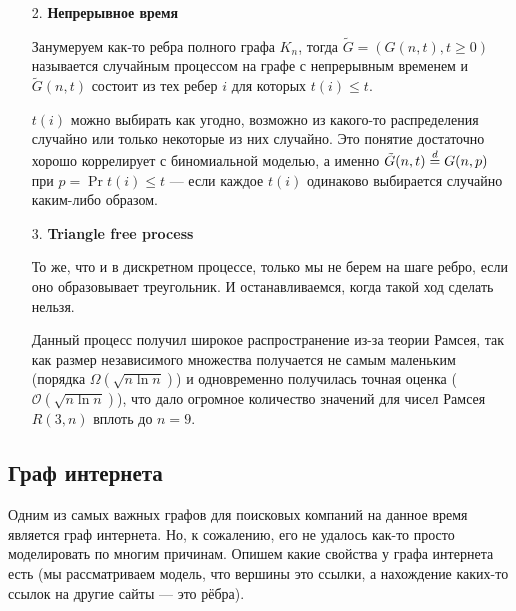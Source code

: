 \begin{itemize}
  \item[2.] \textbf{Непрерывное время}

  \begin{definition}
    Занумеруем как-то ребра полного графа $K_n$, тогда \newline $\tilde{G} = (G(n, t), t \geq 0)$
    называется случайным процессом на графе с непрерывным временем и $\tilde{G}(n, t)$
    состоит из тех ребер $i$ для которых $t(i) \leq t$.
  \end{definition}

  $t(i)$ можно выбирать как угодно, возможно из какого-то распределения случайно
  или только некоторые из них случайно. Это понятие достаточно хорошо коррелирует
  с биномиальной моделью, а именно $\tilde{G}(n, t) \overset{d}{=} G(n, p)$ при $p = 
  \Pr{t(i) \leq t}$ --- если каждое $t(i)$ одинаково выбирается случайно каким-либо
  образом.

  \item[3.] \textbf{Triangle free process}

  То же, что и в дискретном процессе, только мы не берем на шаге ребро, если
  оно образовывает треугольник. И останавливаемся, когда такой ход сделать нельзя.

  Данный процесс получил широкое распространение из-за теории Рамсея, так как
  размер независимого множества получается не самым маленьким (порядка $\Omega(\sqrt{n \ln n})$) и
  одновременно получилась точная оценка ($\mathcal{O}(\sqrt{n \ln n})$), что дало огромное
  количество значений для чисел Рамсея $R(3, n)$ вплоть до $n = 9$.
\end{itemize}

\subsection{Граф интернета}

Одним из самых важных графов для поисковых компаний на данное время является
граф интернета. Но, к сожалению, его не удалось как-то просто моделировать по многим
причинам. Опишем какие свойства у графа интернета есть (мы рассматриваем модель,
что вершины это ссылки, а нахождение каких-то ссылок на другие сайты --- это рёбра).

